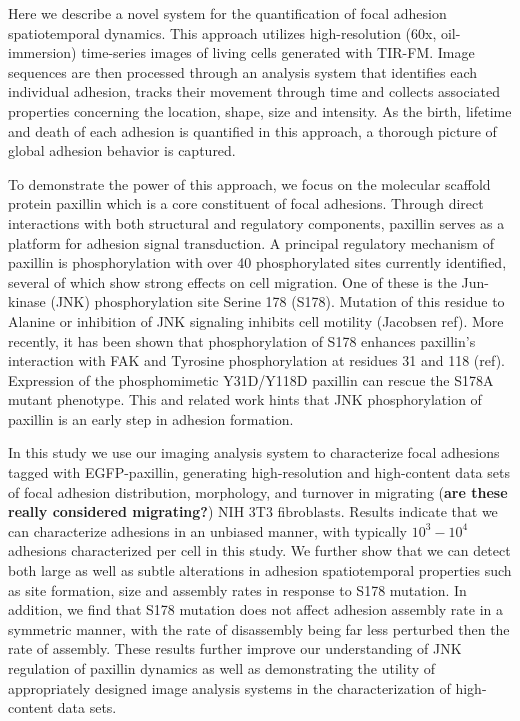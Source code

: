 \documentclass[10pt]{article}
\begin{document}
Here we describe a novel system for the quantification of focal adhesion
spatiotemporal dynamics. This approach utilizes high-resolution (60x,
oil-immersion) time-series images of living cells generated with TIR-FM. Image
sequences are then processed through an analysis system that identifies each
individual adhesion, tracks their movement through time and collects associated
properties concerning the location, shape, size and intensity. As the birth,
lifetime and death of each adhesion is quantified in this approach, a thorough
picture of global adhesion behavior is captured.

To demonstrate the power of this approach, we focus on the molecular scaffold
protein paxillin which is a core constituent of focal adhesions. Through direct
interactions with both structural and regulatory components, paxillin serves as
a platform for adhesion signal transduction. A principal regulatory mechanism of
paxillin is phosphorylation with over 40 phosphorylated sites currently
identified, several of which show strong effects on cell migration. One of these
is the Jun-kinase (JNK) phosphorylation site Serine 178 (S178). Mutation of this
residue to Alanine or inhibition of JNK signaling inhibits cell motility
(Jacobsen ref).  More recently, it has been shown that phosphorylation of S178
enhances paxillin's interaction with FAK and Tyrosine phosphorylation at
residues 31 and 118 (ref). Expression of the phosphomimetic Y31D/Y118D paxillin
can rescue the S178A mutant phenotype. This and related work hints that JNK
phosphorylation of paxillin is an early step in adhesion formation. 

In this study we use our imaging analysis system to characterize focal adhesions
tagged with EGFP-paxillin, generating high-resolution and high-content data sets
of focal adhesion distribution, morphology, and turnover in migrating
(\textbf{are these really considered migrating?}) NIH 3T3 fibroblasts. Results
indicate that we can characterize adhesions in an unbiased manner, with
typically $10^3-10^4$ adhesions characterized per cell in this study. We further
show that we can detect both large as well as subtle alterations in adhesion
spatiotemporal properties such as site formation, size and assembly rates in
response to S178 mutation. In addition, we find that S178 mutation does not
affect adhesion assembly rate in a symmetric manner, with the rate of
disassembly being far less perturbed then the rate of assembly. These results
further improve our understanding of JNK regulation of paxillin dynamics as well
as demonstrating the utility of appropriately designed image analysis systems in
the characterization of high-content data sets. 
\end{document}
